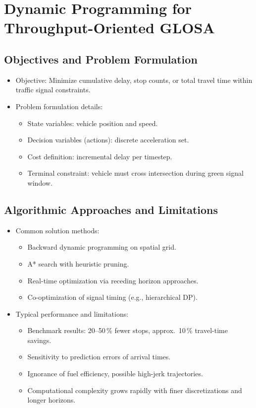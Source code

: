 \section{Dynamic Programming for Throughput-Oriented GLOSA}
\label{sec:flow_glosa}

\subsection{Objectives and Problem Formulation}
\label{subsec:flow_dp_formulation}
\begin{itemize}
    \item Objective: Minimize cumulative delay, stop counts, or total travel time within traffic signal constraints.
    \item Problem formulation details:
    \begin{itemize}
        \item State variables: vehicle position and speed.
        \item Decision variables (actions): discrete acceleration set.
        \item Cost definition: incremental delay per timestep.
        \item Terminal constraint: vehicle must cross intersection during green signal window.
    \end{itemize}
\end{itemize}

\subsection{Algorithmic Approaches and Limitations}
\label{subsec:flow_dp_algorithms_limitations}
\begin{itemize}
    \item Common solution methods:
    \begin{itemize}
        \item Backward dynamic programming on spatial grid.
        \item A* search with heuristic pruning.
        \item Real-time optimization via receding horizon approaches.
        \item Co-optimization of signal timing (e.g., hierarchical DP).
    \end{itemize}
    \item Typical performance and limitations:
    \begin{itemize}
        \item Benchmark results: 20–50\,\% fewer stops, approx.\ 10\,\% travel-time savings.
        \item Sensitivity to prediction errors of arrival times.
        \item Ignorance of fuel efficiency, possible high-jerk trajectories.
        \item Computational complexity grows rapidly with finer discretizations and longer horizons.
    \end{itemize}
\end{itemize}